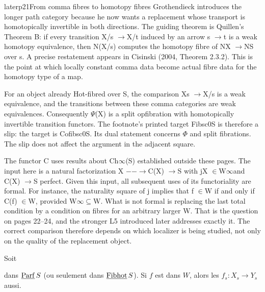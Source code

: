 \begin{dcomment}{later}{p21}{From comma fibres to homotopy fibres}
Grothendieck introduces the longer path category because he now wants a replacement whose transport is homotopically invertible in both directions. The guiding theorem is Quillen’s Theorem B: if every transition X/s \ensuremath{\to}X/t induced by an arrow s \ensuremath{\to}t is a weak homotopy equivalence, then N(X/s) computes the homotopy fibre of NX \ensuremath{\to}NS over s. A precise restatement appears in Cisinski (2004, Theorem 2.3.2). This is the point at which locally constant comma data become actual fibre data for the homotopy type of a map.

For an object already Hot-fibred over S, the comparison Xs \ensuremath{\to}X/s is a weak equivalence, and the transitions between these comma categories are weak equivalences. Consequently \ensuremath{\Psi}(X) is a split opfibration with homotopically invertible transition functors. The footnote’s printed target Fibsc0S is therefore a slip: the target is Cofibsc0S. Its dual statement concerns \ensuremath{\Phi} and split fibrations. The slip does not affect the argument in the adjacent square.

The functor C uses results about Ch\ensuremath{\infty}(S) established outside these pages. The input here is a natural factorization X \ensuremath{-}\ensuremath{-}\ensuremath{\to}C(X) \ensuremath{\to}S with jX \ensuremath{\in}W\ensuremath{\infty}and C(X) \ensuremath{\to}S perfect. Given this input, all subsequent uses of its functoriality are formal. For instance, the naturality square of j implies that f \ensuremath{\in}W if and only if C(f) \ensuremath{\in}W, provided W\ensuremath{\infty}\ensuremath{\subseteq}W. What is not formal is replacing the last total condition by a condition on fibres for an arbitrary larger W. That is the question on pages 22--24, and the stronger L5 introduced later addresses exactly it. The correct comparison therefore depends on which localizer is being studied, not only on the quality of the replacement object.

\end{dcomment}


 Soit
dans $\underline{\mathrm{Parf}}\,S$ (ou seulement dans $\underline{\mathrm{Fibhot}}\,S$). Si $f$ est dans $W$, alors les $f_s : X_s \longrightarrow Y_s$ aussi.

